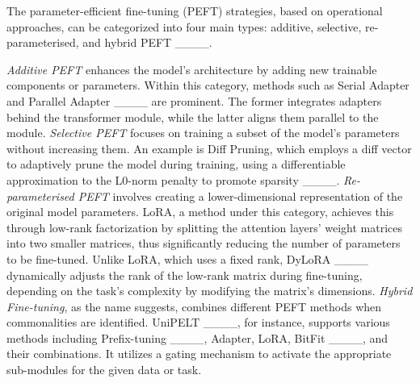The parameter-efficient fine-tuning (PEFT) strategies, based on operational approaches, can be categorized into four main types: additive, selective, re-parameterised, and hybrid PEFT ____. 

\textit{Additive PEFT} enhances the model's architecture by adding new trainable components or parameters. Within this category, methods such as Serial Adapter and Parallel Adapter ____ are prominent. The former integrates adapters behind the transformer module, while the latter aligns them parallel to the module. \textit{Selective PEFT} focuses on training a subset of the model's parameters without increasing them. An example is Diff Pruning, which employs a diff vector to adaptively prune the model during training, using a differentiable approximation to the L0-norm penalty to promote sparsity ____. \textit{Re-parameterised PEFT} involves creating a lower-dimensional representation of the original model parameters. LoRA, a method under this category, achieves this through low-rank factorization by splitting the attention layers' weight matrices into two smaller matrices, thus significantly reducing the number of parameters to be fine-tuned. Unlike LoRA, which uses a fixed rank, DyLoRA ____ dynamically adjusts the rank of the low-rank matrix during fine-tuning, depending on the task's complexity by modifying the matrix's dimensions. \textit{Hybrid Fine-tuning}, as the name suggests, combines different PEFT methods when commonalities are identified. UniPELT ____, for instance, supports various methods including Prefix-tuning ____, Adapter, LoRA, BitFit ____, and their combinations. It utilizes a gating mechanism to activate the appropriate sub-modules for the given data or task.





